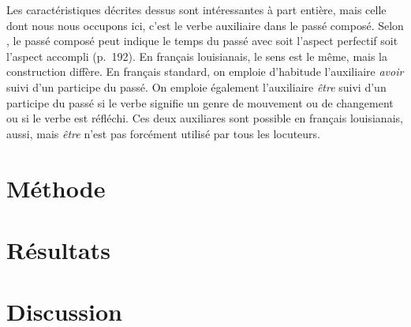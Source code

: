 \documentclass{article}
\newcommand{\lexi}[1]{\textit{#1}}
\begin{document}
    Les caractéristiques décrites dessus sont intéressantes à part entière, mais celle dont nous nous occupons ici, c'est le verbe auxiliaire dans le passé composé.
    Selon \textcite{luscher_emplois_1996}, le passé composé peut indique le temps du passé avec soit l'aspect perfectif soit l'aspect accompli (p.~192).
    En français louisianais, le sens est le même, mais la construction diffère.
    En français standard, on emploie d'habitude l'auxiliaire \lexi{avoir} suivi d'un participe du passé.
    On emploie également l'auxiliaire \lexi{être} suivi d'un participe du passé si le verbe signifie un genre de mouvement ou de changement ou si le verbe est réfléchi.
    Ces deux auxiliares sont possible en français louisianais, aussi, mais \lexi{être} n'est pas forcément utilisé par tous les locuteurs.

  \section{Méthode}
  \section{Résultats}
  \section{Discussion}
  \printbibliography
\end{document}
